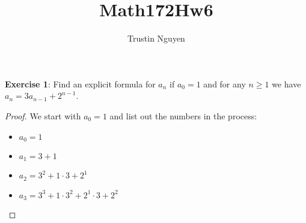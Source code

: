 \documentclass{article}
\title{Math172Hw6}
\author{Trustin Nguyen}
\begin{document}
    \maketitle

\reversemarginpar

\textbf{Exercise 1}: Find an explicit formula for $a_{n}$ if $a_{0} = 1$ and for any $n \geq 1$ we have $a_{n} = 3a_{n - 1} + 2^{n - 1}$.
    \begin{proof}
        We start with $a_{0} = 1$ and list out the numbers in the process:
            \begin{itemize}
                \item $a_{0}  = 1$

                \item $a_{1} = 3 + 1$

                \item $a_{2} = 3^{2} + 1 \cdot 3 + 2^{1}$

                \item $a_{3} = 3^{3} + 1 \cdot 3^{2} + 2^{1} \cdot 3 + 2^{2}$


\end{itemize}
\end{proof}
\end{document}
